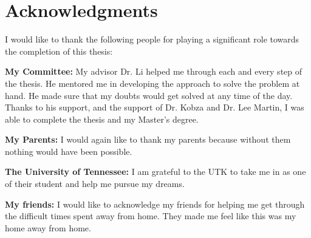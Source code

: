 \chapter*{Acknowledgments}
I would like to thank the following people for playing a significant role towards the completion of this thesis:

\textbf{My Committee:} My advisor Dr. Li helped me through each and every step of the thesis. He mentored me in developing the approach to solve the problem at hand. He made sure that my doubts would get solved at any time of the day. Thanks to his support, and the support of Dr. Kobza and Dr. Lee Martin, I was able to complete the thesis and my Master's degree. 

\textbf{My Parents:} I would again like to thank my parents because without them nothing would have been possible. 

\textbf{The University of Tennessee:} I am grateful to the UTK to take me in as one of their student and help me pursue my dreams.

\textbf{My friends:} I would like to acknowledge my friends for helping me get through the difficult times spent away from home. They made me feel like this was my home away from home.